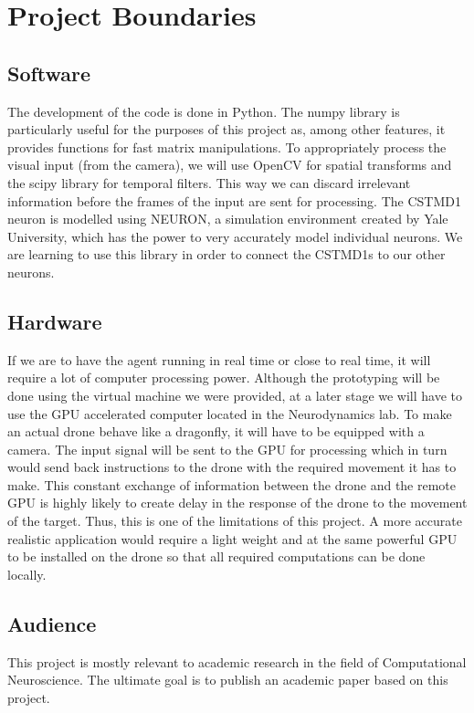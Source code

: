 \documentclass[a4paper,11pt]{article}
\begin{document}

\section{Project Boundaries}

\subsection{Software}
The development of the code is done in Python. The numpy library is particularly useful for the purposes of this project as, among other features, it provides functions for fast matrix manipulations.
To appropriately process the visual input (from the camera), we will use OpenCV for spatial transforms and the scipy library for temporal filters. This way we can discard irrelevant information before the frames of the input are sent for processing.
The CSTMD1 neuron is modelled using NEURON, a simulation environment created by Yale University, which has the power to very accurately model individual neurons. We are learning to use this library in order to connect the CSTMD1s to our other neurons.

\subsection{Hardware}
If we are to have the agent running in real time or close to real time, it will require a lot of computer processing power. Although the prototyping will be done using the virtual machine we were provided, at a later stage we will have to use the GPU accelerated computer located in the Neurodynamics lab.
To make an actual drone behave like a dragonfly, it will have to be equipped with a camera. The input signal will be sent to the GPU for processing which in turn would send back instructions to the drone with the required movement it has to make. This constant exchange of information between the drone and the remote GPU is highly likely to create delay in the response of the drone to the movement of the target. Thus, this is one of the limitations of this project. A more accurate realistic application would require a light weight and at the same powerful GPU to be installed on the drone so that all required computations can be done locally. 

\subsection{Audience}
This project is mostly relevant to academic research in the field of Computational Neuroscience. The ultimate goal is to publish an academic paper based on this project.


{}

\end{document}
